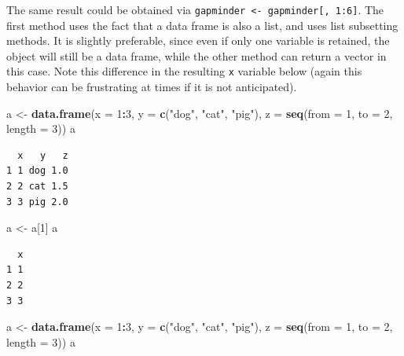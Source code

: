 \documentclass[
]{krantz}
\makeatletter
\newenvironment{Shaded}{\begin{snugshade}}{\end{snugshade}}
\newcommand{\DataTypeTok}[1]{\textcolor[rgb]{0.27,0.27,0.27}{#1}}
\newcommand{\DecValTok}[1]{\textcolor[rgb]{0.06,0.06,0.06}{#1}}
\newcommand{\KeywordTok}[1]{\textcolor[rgb]{0.27,0.27,0.27}{\textbf{#1}}}
\newcommand{\NormalTok}[1]{#1}
\newcommand{\OperatorTok}[1]{\textcolor[rgb]{0.43,0.43,0.43}{\textbf{#1}}}
\newcommand{\StringTok}[1]{\textcolor[rgb]{0.5,0.5,0.5}{#1}}
\newenvironment{kframe}{%
\medskip{}
\setlength{\fboxsep}{.8em}
 \def\at@end@of@kframe{}%
 \ifinner\ifhmode%
  \def\at@end@of@kframe{\end{minipage}}%
  \begin{minipage}{\columnwidth}%
 \fi\fi%
 \def\FrameCommand##1{\hskip\@totalleftmargin \hskip-\fboxsep
 \colorbox{shadecolor}{##1}\hskip-\fboxsep
     \hskip-\linewidth \hskip-\@totalleftmargin \hskip\columnwidth}%
 \MakeFramed {\advance\hsize-\width
   \@totalleftmargin\z@ \linewidth\hsize
   \@setminipage}}%
 {\par\unskip\endMakeFramed%
 \at@end@of@kframe}
\renewenvironment{Shaded}{\begin{kframe}}{\end{kframe}}
\makeatother
\begin{document}
The same result could be obtained via \texttt{gapminder\ \textless{}-\ gapminder{[},\ 1:6{]}}. The first method uses the fact that a data frame is also a list, and uses list subsetting methods. It is slightly preferable, since even if only one variable is retained, the object will still be a data frame, while the other method can return a vector in this case. Note this difference in the resulting \texttt{x} variable below (again this behavior can be frustrating at times if it is not anticipated).

\begin{Shaded}
\begin{Highlighting}[]
\NormalTok{a \textless{}{-}}\StringTok{ }\KeywordTok{data.frame}\NormalTok{(}\DataTypeTok{x =} \DecValTok{1}\OperatorTok{:}\DecValTok{3}\NormalTok{, }\DataTypeTok{y =} \KeywordTok{c}\NormalTok{(}\StringTok{"dog"}\NormalTok{, }\StringTok{"cat"}\NormalTok{, }\StringTok{"pig"}\NormalTok{), }
                \DataTypeTok{z =} \KeywordTok{seq}\NormalTok{(}\DataTypeTok{from =} \DecValTok{1}\NormalTok{, }\DataTypeTok{to =} \DecValTok{2}\NormalTok{, }\DataTypeTok{length =} \DecValTok{3}\NormalTok{))}
\NormalTok{a}
\end{Highlighting}
\end{Shaded}

\begin{verbatim}
  x   y   z
1 1 dog 1.0
2 2 cat 1.5
3 3 pig 2.0
\end{verbatim}

\begin{Shaded}
\begin{Highlighting}[]
\NormalTok{a \textless{}{-}}\StringTok{ }\NormalTok{a[}\DecValTok{1}\NormalTok{]}
\NormalTok{a }
\end{Highlighting}
\end{Shaded}

\begin{verbatim}
  x
1 1
2 2
3 3
\end{verbatim}

\begin{Shaded}
\begin{Highlighting}[]
\NormalTok{a \textless{}{-}}\StringTok{ }\KeywordTok{data.frame}\NormalTok{(}\DataTypeTok{x =} \DecValTok{1}\OperatorTok{:}\DecValTok{3}\NormalTok{, }\DataTypeTok{y =} \KeywordTok{c}\NormalTok{(}\StringTok{"dog"}\NormalTok{, }\StringTok{"cat"}\NormalTok{, }\StringTok{"pig"}\NormalTok{), }
                \DataTypeTok{z =} \KeywordTok{seq}\NormalTok{(}\DataTypeTok{from =} \DecValTok{1}\NormalTok{, }\DataTypeTok{to =} \DecValTok{2}\NormalTok{, }\DataTypeTok{length =} \DecValTok{3}\NormalTok{))}
\NormalTok{a }
\end{Highlighting}
\end{Shaded}
\end{document}
